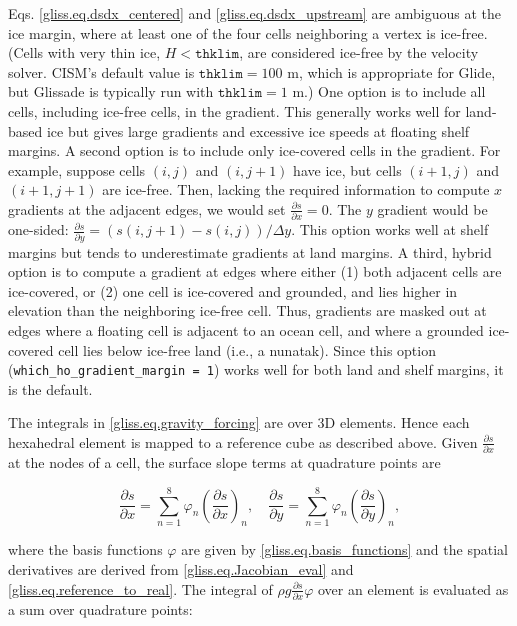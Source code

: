 {Eqs. \eqref{gliss.eq.dsdx_centered} and \eqref{gliss.eq.dsdx_upstream} are ambiguous at the ice margin,
where at least one of the four cells neighboring a vertex is ice-free. (Cells with very thin ice,
$H < \texttt{thklim}$, are considered ice-free by the velocity solver. CISM's default value is $\texttt{thklim} = 100 \textrm{ m}$,
which is appropriate for Glide, but Glissade is typically run with $\texttt{thklim} = 1 \textrm{ m}$.)
One option is to include all cells, including ice-free cells, in the gradient.
This generally works well for land-based ice but gives large gradients and excessive ice speeds
at floating shelf margins.  A second option is to include only ice-covered cells in the gradient.
For example, suppose cells $(i,j)$ and $(i,j+1)$ have ice, but cells $(i+1,j)$ and $(i+1,j+1)$ are
ice-free.  Then, lacking the required information to compute $x$ gradients at the adjacent edges,
we would set $\frac{\partial s}{\partial x} = 0$.  The $y$ gradient would be one-sided:
$\frac{\partial s}{\partial y} = (s(i,j+1)-s(i,j)) \slash \Delta y$.  
This option works well at shelf margins but tends to underestimate gradients at land margins.
A third, hybrid option is to compute a gradient at edges where either
(1) both adjacent cells are ice-covered, or 
(2) one cell is ice-covered and grounded, and lies higher in elevation than the
neighboring ice-free cell.
Thus, gradients are masked out at edges where a floating cell is adjacent
to an ocean cell, and where a grounded ice-covered cell lies below
ice-free land (i.e., a nunatak).
Since this option (\texttt{which\_ho\_gradient\_margin = 1})
works well for both land and shelf margins, it is the default. 
    
The integrals in \eqref{gliss.eq.gravity_forcing} are over 3D elements.
Hence each hexahedral element is mapped to a reference cube as described above. 
Given $\frac{\partial s}{\partial x}$ at the nodes of a cell,
the surface slope terms at quadrature points are

\begin{equation}
  \frac{\partial s}{\partial x} = \sum\limits_{n=1}^{8}{{{\varphi }_{n}}}{{\left( \frac{\partial s}{\partial x} \right)}_{n}}, \quad
  \frac{\partial s}{\partial y} = \sum\limits_{n=1}^{8}{{{\varphi }_{n}}}{{\left( \frac{\partial s}{\partial y} \right)}_{n}},
\end{equation}

\noindent
where the basis functions $\varphi$ are given by \eqref{gliss.eq.basis_functions}
and the spatial derivatives are derived from \eqref{gliss.eq.Jacobian_eval} and \eqref{gliss.eq.reference_to_real}.
The integral of $\rho g \frac{\partial s}{\partial x} \varphi$
over an element is evaluated as a sum over quadrature points:

}
